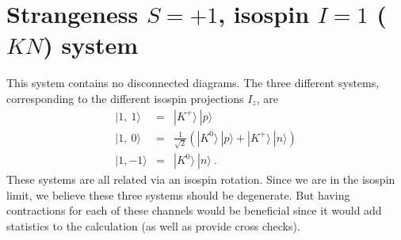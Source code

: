 \documentclass[%
 preprint,
nofootinbib,
 amsmath,amssymb,
 aps,
]{revtex4-2}
\begin{document}
\section{Strangeness $S=+1$, isospin $I=1$ ($KN$) system}
This system contains no disconnected diagrams.  The three different systems, corresponding to the different isospin projections $I_z$, are
\begin{eqnarray*}
|1,\ 1\rangle&=&|K^+\rangle\ |p\rangle\\
|1,\ 0\rangle&=&\frac{1}{\sqrt{2}}\left(|K^0\rangle\ |p\rangle + |K^+\rangle\ |n\rangle \right)\\
|1,-1\rangle&=&|K^0\rangle\ |n\rangle\ .
\end{eqnarray*}
These systems are all related via an isospin rotation.  Since we are in the isospin limit, we believe these three systems should be degenerate.  But having contractions for each of these channels would be beneficial since it would add statistics to the calculation (as well as provide cross checks).
\end{document}
